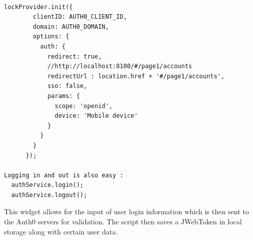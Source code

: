 \begin{verbatim}

lockProvider.init({
        clientID: AUTH0_CLIENT_ID,
        domain: AUTH0_DOMAIN,
        options: {
          auth: {
            redirect: true,
            //http://localhost:8100/#/page1/accounts
            redirectUrl : location.href + '#/page1/accounts',
            sso: false,
            params: {
              scope: 'openid',
              device: 'Mobile device'
            }
          }
        }
      });

Logging in and out is also easy : 
  authService.login();
  authService.logout();
\end{verbatim}
    This widget allows for the input of user login information which is then sent to the Auth0 servers for validation.
    The script then saves a JWebToken in local storage along with certain user data. 
    



